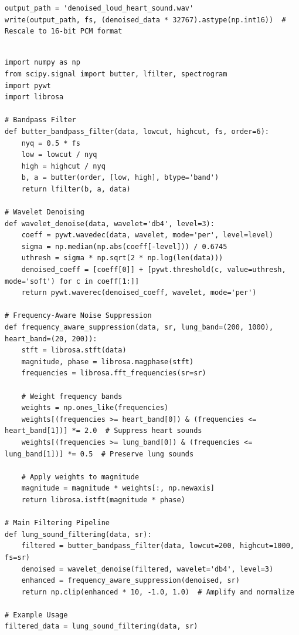 \documentclass[conference]{IEEEtran}
\begin{document}
{\begin{lstlisting}[style=mypython, caption={Code for cleaning the sound using wavelet transform}, label={lst:mel-spectrogram}]
output_path = 'denoised_loud_heart_sound.wav'
write(output_path, fs, (denoised_data * 32767).astype(np.int16))  # Rescale to 16-bit PCM format
    
\end{lstlisting}






\begin{lstlisting}[style=mypython, caption={Master Algorithm with Amplification}, label={lst:master-algorithm}]
import numpy as np
from scipy.signal import butter, lfilter, spectrogram
import pywt
import librosa

# Bandpass Filter
def butter_bandpass_filter(data, lowcut, highcut, fs, order=6):
    nyq = 0.5 * fs
    low = lowcut / nyq
    high = highcut / nyq
    b, a = butter(order, [low, high], btype='band')
    return lfilter(b, a, data)

# Wavelet Denoising
def wavelet_denoise(data, wavelet='db4', level=3):
    coeff = pywt.wavedec(data, wavelet, mode='per', level=level)
    sigma = np.median(np.abs(coeff[-level])) / 0.6745
    uthresh = sigma * np.sqrt(2 * np.log(len(data)))
    denoised_coeff = [coeff[0]] + [pywt.threshold(c, value=uthresh, mode='soft') for c in coeff[1:]]
    return pywt.waverec(denoised_coeff, wavelet, mode='per')

# Frequency-Aware Noise Suppression
def frequency_aware_suppression(data, sr, lung_band=(200, 1000), heart_band=(20, 200)):
    stft = librosa.stft(data)
    magnitude, phase = librosa.magphase(stft)
    frequencies = librosa.fft_frequencies(sr=sr)

    # Weight frequency bands
    weights = np.ones_like(frequencies)
    weights[(frequencies >= heart_band[0]) & (frequencies <= heart_band[1])] *= 2.0  # Suppress heart sounds
    weights[(frequencies >= lung_band[0]) & (frequencies <= lung_band[1])] *= 0.5  # Preserve lung sounds

    # Apply weights to magnitude
    magnitude = magnitude * weights[:, np.newaxis]
    return librosa.istft(magnitude * phase)

# Main Filtering Pipeline
def lung_sound_filtering(data, sr):
    filtered = butter_bandpass_filter(data, lowcut=200, highcut=1000, fs=sr)
    denoised = wavelet_denoise(filtered, wavelet='db4', level=3)
    enhanced = frequency_aware_suppression(denoised, sr)
    return np.clip(enhanced * 10, -1.0, 1.0)  # Amplify and normalize

# Example Usage
filtered_data = lung_sound_filtering(data, sr)


\end{lstlisting}}
\end{document}

